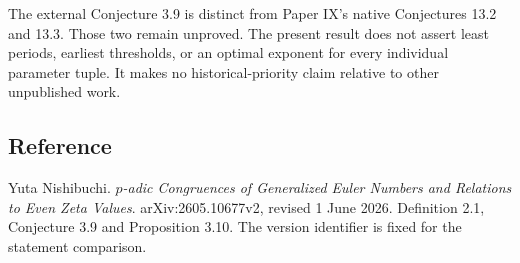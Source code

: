 The external Conjecture 3.9 is distinct from Paper IX's native Conjectures 13.2 and 13.3. Those two remain unproved. The present result does not assert least periods, earliest thresholds, or an optimal exponent for every individual parameter tuple. It makes no historical-priority claim relative to other unpublished work.

\subsection*{Reference}
Yuta Nishibuchi. \emph{$p$-adic Congruences of Generalized Euler Numbers and Relations to Even Zeta Values}. arXiv:2605.10677v2, revised 1 June 2026. Definition 2.1, Conjecture 3.9 and Proposition 3.10. The version identifier is fixed for the statement comparison.
